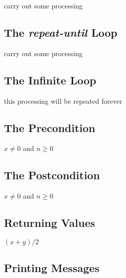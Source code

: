 \documentclass{amsart}
\begin{document}
\begin{algorithmic}
    \STATE carry out some processing 
\ENDWHILE
\end{algorithmic}

\subsection{The \emph{repeat-until} Loop}

\begin{algorithmic}
\REPEAT
    \STATE carry out some processing 
\end{algorithmic}

\subsection{The Infinite Loop}

\begin{algorithmic}
\LOOP
    \STATE this processing will be repeated forever
\ENDLOOP
\end{algorithmic}

\subsection{The Precondition}

\begin{algorithmic}
\REQUIRE $x \neq 0$ and $n \geq 0$
\end{algorithmic}

\subsection{The Postcondition}

\begin{algorithmic}
    \ENSURE $x \neq 0$ and $n \geq 0$
\end{algorithmic}

\subsection{Returning Values}

\begin{algorithmic}
\RETURN $(x+y)/2$
\end{algorithmic}

\subsection{Printing Messages}
\end{document}
